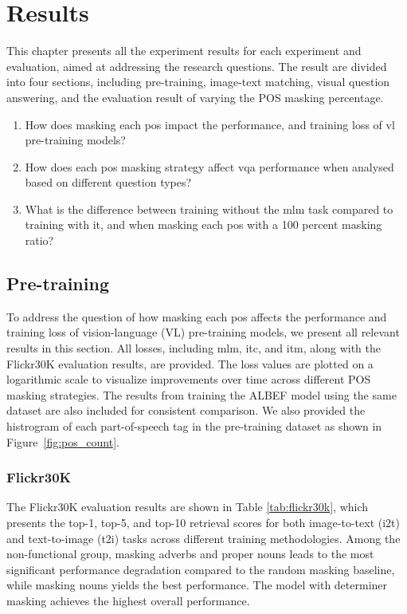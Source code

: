 \chapter{Results}
This chapter presents all the experiment results for each experiment and evaluation, aimed at addressing the research questions.
The result are divided into four sections, including pre-training, image-text matching, visual question answering, and the evaluation result of varying the POS masking percentage.
\begin{enumerate}  
    \item How does masking each \acrshort{pos} impact the performance, and training loss of \acrshort{vl} pre-training models?  
    \item How does each \acrshort{pos} masking strategy affect \acrfull{vqa} performance when analysed based on different question types?  
    \item What is the difference between training without the \acrshort{mlm} task compared to training with it, and when masking each \acrshort{pos} with a 100 percent masking ratio?  
\end{enumerate}

\section{Pre-training}
To address the question of how masking each \acrshort{pos} affects the performance and training loss of vision-language (VL) pre-training models, we present all relevant results in this section.  
All losses, including \acrshort{mlm}, \acrshort{itc}, and \acrshort{itm}, along with the Flickr30K evaluation results, are provided.  
The loss values are plotted on a logarithmic scale to visualize improvements over time across different POS masking strategies.  
The results from training the ALBEF model using the same dataset are also included for consistent comparison.
We also provided the histrogram of each part-of-speech tag in the pre-training dataset as shown in Figure~\ref{fig:pos_count}.

\subsection{Flickr30K}
The Flickr30K evaluation results are shown in Table \ref{tab:flickr30k}, which presents the top-1, top-5, and top-10 retrieval scores for both image-to-text (i2t) and text-to-image (t2i) tasks across different training methodologies.  
Among the non-functional group, masking adverbs and proper nouns leads to the most significant performance degradation compared to the random masking baseline, while masking nouns yields the best performance.  
The model with determiner masking achieves the highest overall performance.

